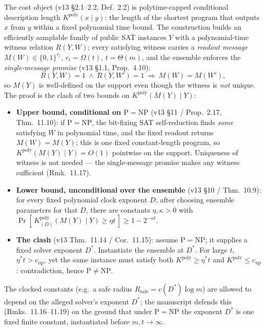 \documentclass[11pt]{article}
\theoremstyle{definition}
\newcommand{\Kpoly}{K^{\mathrm{poly}}}
\newcommand{\MY}{M(Y)}
\begin{document}
The cost object (v13 \S2.1--2.2, Def.~2.2) is polytime-capped conditional
description length $\Kpoly(x\mid y)$: the length of the shortest program that
outputs $x$ from $y$ within a fixed polynomial time bound. The construction builds
an efficiently samplable family of public SAT instances $Y$ with a polynomial-time
witness relation $R(Y,W)$; every satisfying witness carries a \emph{readout
message} $M(W)\in\{0,1\}^{r_t}$, $r_t=\Omega(t)$, $t=\Theta(m)$, and the ensemble
enforces the \emph{single-message promise} (v13 \S1.1, Prop.~4.10):
\[
  R(Y,W)=1 \ \wedge\ R(Y,W')=1 \ \Longrightarrow\ M(W)=M(W'),
\]
so $\MY$ is well-defined on the support even though the witness is \emph{not}
unique. The proof is the clash of two bounds on $\Kpoly(\MY\mid Y)$:
\begin{itemize}
  \item \textbf{Upper bound, conditional on $\mathrm{P}=\mathrm{NP}$}
        (v13 \S11 / Prop.~2.17, Thm.~11.10): if $\mathrm{P}=\mathrm{NP}$, the
        bit-fixing SAT self-reduction finds \emph{some} satisfying $W$ in
        polynomial time, and the fixed readout returns $M(W)=\MY$; this is one
        fixed constant-length program, so $\Kpoly(\MY\mid Y)=O(1)$ pointwise on
        the support. Uniqueness of witness is not needed --- the single-message
        promise makes any witness sufficient (Rmk.~11.17).
  \item \textbf{Lower bound, unconditional over the ensemble}
        (v13 \S10 / Thm.~10.9): for every fixed polynomial clock exponent $D$,
        after choosing ensemble parameters for that $D$, there are constants
        $\eta,\kappa>0$ with
        $\Pr[\,\Kpoly_{(D)}(\MY\mid Y)\ge\eta t\,]\ge 1-2^{-\kappa t}$.
  \item \textbf{The clash} (v13 Thm.~11.14 / Cor.~11.15): assume
        $\mathrm{P}=\mathrm{NP}$; it supplies a fixed solver exponent $D^\ast$.
        Instantiate the ensemble at $D^\ast$. For large $t$,
        $\eta^\ast t > c_{\mathrm{up}}$, yet the same instance must satisfy both
        $\Kpoly\ge\eta^\ast t$ and $\Kpoly\le c_{\mathrm{up}}$: contradiction,
        hence $\mathrm{P}\neq\mathrm{NP}$.
\end{itemize}
The clocked constants (e.g.\ a safe radius $R_{\mathrm{safe}}=c(D^\ast)\log m$) are
allowed to depend on the alleged solver's exponent $D^\ast$; the manuscript
defends this (Rmks.~11.16--11.19) on the ground that under $\mathrm{P}=\mathrm{NP}$
the exponent $D^\ast$ is one fixed finite constant, instantiated before
$m,t\to\infty$.
\end{document}
